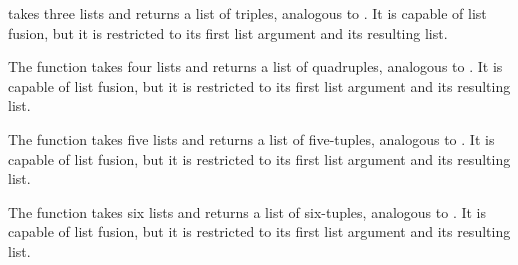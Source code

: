 \begin{haddockdesc}
\item[\begin{tabular}{@{}l}
zip3 :: {\char 91}a{\char 93} -> {\char 91}b{\char 93} -> {\char 91}c{\char 93} -> {\char 91}(a, b, c){\char 93}
\end{tabular}]
{\haddockbegindoc
{} takes three lists and returns a list of triples, analogous to
 .
 It is capable of list fusion, but it is restricted to its
 first list argument and its resulting list.\par}
\end{haddockdesc}
\begin{haddockdesc}
\item[\begin{tabular}{@{}l}
zip4 :: {\char 91}a{\char 93} -> {\char 91}b{\char 93} -> {\char 91}c{\char 93} -> {\char 91}d{\char 93} -> {\char 91}(a, b, c, d){\char 93}
\end{tabular}]
{\haddockbegindoc
The  function takes four lists and returns a list of
 quadruples, analogous to .
 It is capable of list fusion, but it is restricted to its
 first list argument and its resulting list.\par}
\end{haddockdesc}
\begin{haddockdesc}
\item[\begin{tabular}{@{}l}
zip5 :: {\char 91}a{\char 93} -> {\char 91}b{\char 93} -> {\char 91}c{\char 93} -> {\char 91}d{\char 93} -> {\char 91}e{\char 93} -> {\char 91}(a, b, c, d, e){\char 93}
\end{tabular}]
{\haddockbegindoc
The  function takes five lists and returns a list of
 five-tuples, analogous to .
 It is capable of list fusion, but it is restricted to its
 first list argument and its resulting list.\par}
\end{haddockdesc}
\begin{haddockdesc}
\item[\begin{tabular}{@{}l}
zip6 :: {\char 91}a{\char 93} -> {\char 91}b{\char 93} -> {\char 91}c{\char 93} -> {\char 91}d{\char 93} -> {\char 91}e{\char 93} -> {\char 91}f{\char 93} -> {\char 91}(a, b, c, d, e, f){\char 93}
\end{tabular}]
{\haddockbegindoc
The  function takes six lists and returns a list of six-tuples,
 analogous to .
 It is capable of list fusion, but it is restricted to its
 first list argument and its resulting list.\par}
\end{haddockdesc}
